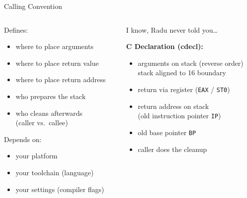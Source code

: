 \documentclass[beamer]{uibk}
\begin{document}
\begin{frame}{Calling Convention}
    \begin{columns}
        \begin{column}{0.5\textwidth}
            Defines:

            \begin{itemize}
                \item where to place arguments
                \item where to place return value
                \item where to place return address
                \item who prepares the stack
                \item who cleans afterwards\\
                    (caller vs.\ callee)
            \end{itemize}

            \pause

            Depends on:

            \begin{itemize}
                \item your platform
                \item your toolchain (language)
                \item your settings (compiler flags)
            \end{itemize}

        \end{column}

        \pause

        \begin{column}{0.5\textwidth}
            I know, Radu never told you\dots

            \medskip

            \textbf{C Declaration (cdecl):}

            \begin{itemize}
                \item arguments on stack (reverse order)\\
                    stack aligned to \SI{16}{\byte} boundary
                \item return via register (\texttt{EAX} / \texttt{ST0})
                \item return address on stack\\
                    (old instruction pointer \texttt{IP})
                \item old base pointer \texttt{BP}
                \item caller does the cleanup
            \end{itemize}
        \end{column}
    \end{columns}
\end{frame}
\end{document}
